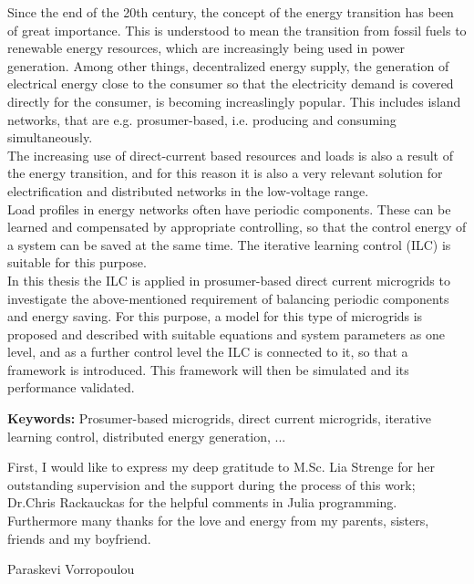 \documentclass[a4paper,12pt,twoside]{kth-mag}
\begin{document}

\begin{abstracti}
Since the end of the 20th century, the concept of the energy transition has been of great importance. This is understood to mean the transition from fossil fuels to renewable energy resources, which are increasingly being used in power generation. Among other things, decentralized energy supply, the generation of electrical energy close to the consumer so that the electricity demand is covered directly for the consumer, is becoming increaslingly popular. This includes island networks, that are e.g. prosumer-based, i.e. producing and consuming simultaneously.
\\The increasing use of direct-current based resources and loads is also a result of the energy transition, and for this reason it is also a very relevant solution for electrification and distributed networks in the low-voltage range.
\\Load profiles in energy networks often have periodic components. These can be learned and compensated by appropriate controlling, so that the control energy of a system can be saved at the same time. The iterative learning control (ILC) is suitable for this purpose.  
\\ In this thesis the ILC is applied in prosumer-based direct current microgrids to investigate the above-mentioned requirement of balancing periodic components and energy saving. For this purpose, a model for this type of microgrids is proposed and described with suitable equations and system parameters as one level, and as a further control level the ILC is connected to it, so that a framework is introduced. This framework will then be simulated and its performance validated.

{\textbf{Keywords:} Prosumer-based microgrids, direct current microgrids, iterative learning control, distributed energy generation, ...}
\end{abstracti}

\begin{acknowledgements}

First, I would like to express my deep gratitude to M.Sc. Lia Strenge for her outstanding supervision and the support during the process of this work; Dr.Chris Rackauckas for the helpful comments in Julia programming.  \\ Furthermore many thanks for the love and energy from my parents, sisters, friends and my boyfriend. 
\vspace{10mm}

Paraskevi Vorropoulou

\end{acknowledgements}
\clearpage
\tableofcontents
\clearpage
\listoffigures
\clearpage
\listoftables
\end{document}
